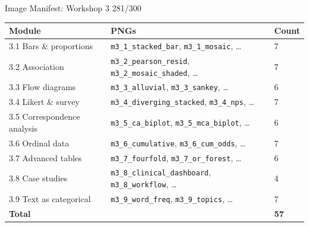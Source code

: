 \documentclass[10pt]{beamer}
\newcommand{\smark}[1]{\hfill{\scriptsize\color{codegray}#1}}
\begin{document}
\begin{frame}{Image Manifest: Workshop 3}
\smark{281/300}
\centering\scriptsize
\begin{tabular}{@{}lll@{}}
    \toprule
    \textbf{Module} & \textbf{PNGs} & \textbf{Count} \\
    \midrule
    3.1 Bars \& proportions & \texttt{m3\_1\_stacked\_bar}, \texttt{m3\_1\_mosaic}, \ldots & 7 \\
    3.2 Association         & \texttt{m3\_2\_pearson\_resid}, \texttt{m3\_2\_mosaic\_shaded}, \ldots & 7 \\
    3.3 Flow diagrams       & \texttt{m3\_3\_alluvial}, \texttt{m3\_3\_sankey}, \ldots & 6 \\
    3.4 Likert \& survey    & \texttt{m3\_4\_diverging\_stacked}, \texttt{m3\_4\_nps}, \ldots & 7 \\
    3.5 Correspondence analysis & \texttt{m3\_5\_ca\_biplot}, \texttt{m3\_5\_mca\_biplot}, \ldots & 6 \\
    3.6 Ordinal data        & \texttt{m3\_6\_cumulative}, \texttt{m3\_6\_cum\_odds}, \ldots & 7 \\
    3.7 Advanced tables     & \texttt{m3\_7\_fourfold}, \texttt{m3\_7\_or\_forest}, \ldots & 6 \\
    3.8 Case studies        & \texttt{m3\_8\_clinical\_dashboard}, \texttt{m3\_8\_workflow}, \ldots & 4 \\
    3.9 Text as categorical & \texttt{m3\_9\_word\_freq}, \texttt{m3\_9\_topics}, \ldots & 7 \\
    \midrule
    \textbf{Total}          &                                    & \textbf{57} \\
    \bottomrule
\end{tabular}
\end{frame}
\end{document}
